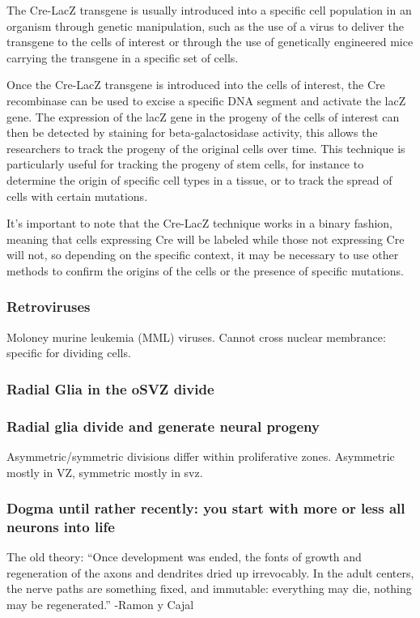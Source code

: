 \begin{itemize}
\begin{itemize}
The Cre-LacZ transgene is usually introduced into a specific cell population in an organism through genetic manipulation, such as the use of a virus to deliver the transgene to the cells of interest or through the use of genetically engineered mice carrying the transgene in a specific set of cells.

Once the Cre-LacZ transgene is introduced into the cells of interest, the Cre recombinase can be used to excise a specific DNA segment and activate the lacZ gene. The expression of the lacZ gene in the progeny of the cells of interest can then be detected by staining for beta-galactosidase activity, this allows the researchers to track the progeny of the original cells over time. This technique is particularly useful for tracking the progeny of stem cells, for instance to determine the origin of specific cell types in a tissue, or to track the spread of cells with certain mutations.

It's important to note that the Cre-LacZ technique works in a binary fashion, meaning that cells expressing Cre will be labeled while those not expressing Cre will not, so depending on the specific context, it may be necessary to use other methods to confirm the origins of the cells or the presence of specific mutations.
\subsubsection{Retroviruses}
Moloney murine leukemia (MML) viruses. Cannot cross nuclear membrance: specific for dividing cells. 
\subsubsection{Radial Glia in the oSVZ divide}
\subsubsection{Radial glia divide and generate neural progeny}
Asymmetric/symmetric divisions differ within proliferative zones. Asymmetric mostly in VZ, symmetric mostly in svz. 
\subsubsection{Dogma until rather recently: you start with more or less all neurons into life}
The old theory: “Once development was ended, the fonts of
growth and regeneration of the axons and
dendrites dried up irrevocably. In the adult
centers, the nerve paths are something fixed,
and immutable: everything may die, nothing
may be regenerated.” -Ramon y Cajal

\end{itemize}
\end{itemize}
